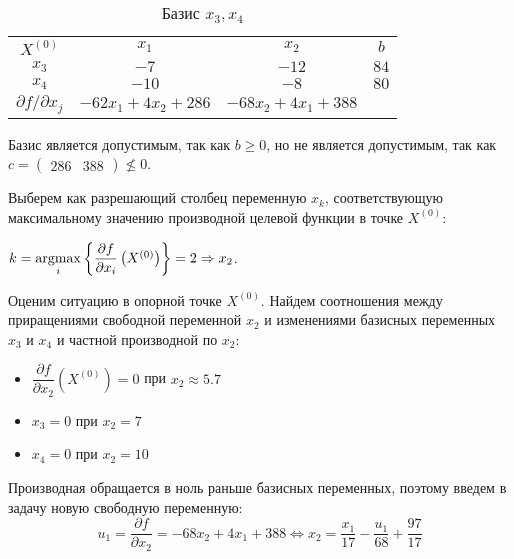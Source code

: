 \begin{table}[H]
\begin{center}
	\def\tabcolsep{15pt}
	\def\arraystretch{1.3}
	\caption{Базис $x_3, x_4$}
	\label{tab:simplex_1}
	\begin{tabular}{|c||c|c||c|}
		\hline
		$X^{(0)}$ & $x_1$ & $x_2$ & $b$ \\ 
		\hhline{|=#==#=|}
		$x_3$ & $-7$ & $-12$ & $84$ \\ 
		\hline
		$x_4$ & $-10$ & $-8$ & $80$ \\ 
		\hhline{|=#==#=|}
		$\partial f / \partial x_j$ & $-62 x_1 + 4 x_2 + 286$ & $-68 x_2 + 4 x_1 + 388$ &  \\ 
		\hline
	\end{tabular}
\end{center}
\end{table}

Базис является допустимым, так как $b \geq 0$, но не является допустимым, так как $c = \begin{pmatrix} 286 & 388 \end{pmatrix} \nleqslant 0$.

Выберем как разрешающий столбец переменную $x_k	$, соответствующую максимальному значению производной целевой функции в точке $X^{(0)}$: 

$k = \operatorname*{argmax}\limits_i\left\{\dfrac{\partial f}{\partial x_i}\left(X^{(0)}\right)\right\} = 2 \Rightarrow x_2$.

Оценим ситуацию в опорной точке $X^{(0)}$. Найдем соотношения между приращениями свободной переменной $x_2$ и изменениями базисных переменных $x_3$ и $x_4$ и частной производной по $x_2$:
\begin{itemize}
\item $\dfrac{\partial f}{\partial x_2}\left(X^{(0)}\right) = 0$ при $x_2 \approx 5.7$
\item $x_3 = 0$ при $x_2 = 7$
\item $x_4 = 0$ при $x_2 = 10$
\end{itemize}

Производная обращается в ноль раньше базисных переменных, поэтому введем в задачу новую свободную переменную:
\begin{equation*}
u_1 = \frac{\partial f}{\partial x_2} = -68 x_2 + 4 x_1 + 388
\Longleftrightarrow
x_2 = \frac{x_1}{17} - \frac{u_1}{68} + \frac{97}{17}
\end{equation*}

